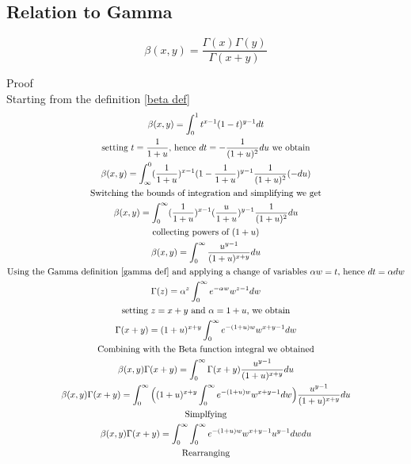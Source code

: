 \documentclass[a4paper]{article}
\begin{document}
\subsection{Relation to Gamma}
\begin{theorem} \label{relation to beta}
\begin{equation}
\boxed{
\beta(x, y) = \frac{\Gamma(x) \Gamma(y)}{\Gamma(x+y)}
}
\end{equation}

Proof
\\
Starting from the definition \ref{beta def}
\begin{gather*}
\beta(x, y) = \int_{0}^{1} t^{x-1} (1-t)^{y-1} dt
\\
\text{setting $t = \frac{1}{1+u}$, hence $dt = -\frac{1}{(1+u)^2} du$ we obtain}
\\
\beta(x, y) = \int_{\infty}^{0} (\frac{1}{1+u})^{x-1} (1-\frac{1}{1+u})^{y-1} \frac{1}{(1+u)^2} (-du)
\\
\text{Switching the bounds of integration and simplifying we get}
\\
\beta(x, y) = \int_{0}^{\infty} (\frac{1}{1+u})^{x-1} (\frac{u}{1+u})^{y-1} \frac{1}{(1+u)^2} du
\\
\text{collecting powers of $(1+u)$}
\\
\beta(x, y) = \int_{0}^{\infty} 
\frac{u^{y-1}}{(1+u)^{x+y}} du
\\
\text{Using the Gamma definition \ref{gamma def} and applying a change of variables $\alpha w = t$, hence $dt = \alpha dw$}
\\
\Gamma(z) = \alpha^z  \int_{0}^{\infty} e^{-\alpha w} w^{z-1} dw
\\
\text{setting $z = x+y$ and $\alpha = 1+u$, we obtain}
\\
\Gamma(x+y) = (1+u)^{x+y}  \int_{0}^{\infty} e^{-(1+u) w} w^{x+y-1} dw
\\
\text{Combining with the Beta function integral we obtained}
\\
\beta(x, y) \Gamma(x+y) = \int_{0}^{\infty}  \Gamma(x+y) \frac{u^{y-1}}{(1+u)^{x+y}} du
\\
\beta(x, y) \Gamma(x+y) =
\int_{0}^{\infty}  \Big( (1+u)^{x+y} \int_{0}^{\infty} e^{-(1+u) w} w^{x+y-1} dw \Big) \frac{u^{y-1}}{(1+u)^{x+y}} du
\\
\text{Simplfying}
\\
\beta(x, y) \Gamma(x+y) =
\int_{0}^{\infty} \int_{0}^{\infty} e^{-(1+u) w} w^{x+y-1}  u^{y-1} dw du
\\
\text{Rearranging}
\\

\end{gather*}
\end{theorem}
\end{document}
